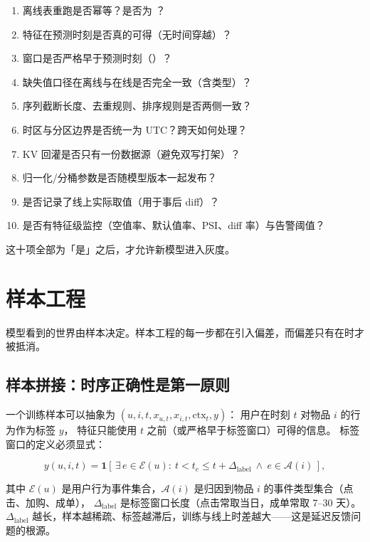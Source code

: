 \begin{toolbox}
\begin{enumerate}
  \item 离线表重跑是否幂等？是否为 ？
  \item 特征在预测时刻是否真的可得（无时间穿越）？
  \item 窗口是否严格早于预测时刻（）？
  \item 缺失值口径在离线与在线是否完全一致（含类型）？
  \item 序列截断长度、去重规则、排序规则是否两侧一致？
  \item 时区与分区边界是否统一为 UTC？跨天如何处理？
  \item KV 回灌是否只有一份数据源（避免双写打架）？
  \item 归一化/分桶参数是否随模型版本一起发布？
  \item 是否记录了线上实际取值（用于事后 diff）？
  \item 是否有特征级监控（空值率、默认值率、PSI、diff 率）与告警阈值？
\end{enumerate}
这十项全部为「是」之后，才允许新模型进入灰度。
\end{toolbox}

\section{样本工程}

模型看到的世界由样本决定。样本工程的每一步都在引入偏差，而偏差只有在时才被抵消。

\subsection{样本拼接：时序正确性是第一原则}

一个训练样本可以抽象为 $(u, i, t, x_{u,t}, x_{i,t}, \text{ctx}_t, y)$：
用户在时刻 $t$ 对物品 $i$ 的行为作为标签 $y$，
特征只能使用 $t$ 之前（或严格早于标签窗口）可得的信息。
标签窗口的定义必须显式：

\begin{equation}
y(u,i,t) = \mathbf{1}\!\left[\, \exists\, e \in \mathcal{E}(u):\ t < t_{e} \le t + \Delta_{\text{label}}
\ \wedge\ e \in \mathcal{A}(i) \,\right],
\label{eq:label-window}
\end{equation}

其中 $\mathcal{E}(u)$ 是用户行为事件集合，$\mathcal{A}(i)$ 是归因到物品 $i$ 的事件类型集合（点击、加购、成单），
$\Delta_{\text{label}}$ 是标签窗口长度（点击常取当日，成单常取 7--30 天）。
$\Delta_{\text{label}}$ 越长，样本越稀疏、标签越滞后，训练与线上时差越大——这是延迟反馈问题的根源。

